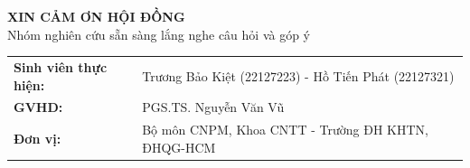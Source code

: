 \begin{frame}[plain]
  \centering
  \vfill
  {\Large\textbf{XIN CẢM ƠN HỘI ĐỒNG}}\\[0.3cm]
  {\normalsize Nhóm nghiên cứu sẵn sàng lắng nghe câu hỏi và góp ý}
  \vfill
  \scriptsize
  \begin{tabular}{ll}
    \textbf{Sinh viên thực hiện:} & Trương Bảo Kiệt (22127223) - Hồ Tiến Phát (22127321) \\
    \textbf{GVHD:} & PGS.TS. Nguyễn Văn Vũ \\
    \textbf{Đơn vị:} & Bộ môn CNPM, Khoa CNTT - Trường ĐH KHTN, ĐHQG-HCM
  \end{tabular}
  \vfill
\end{frame}


